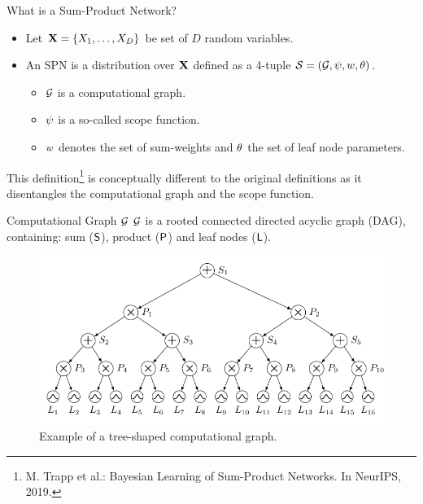\begin{frame}{What is a Sum-Product Network?}
\begin{itemize}
  \item Let $\mathbf{X} = \{X_1, \dots, X_D\}$ be set of $D$ random variables.
  \item An SPN is a distribution over $\mathbf{X}$ defined as a 4-tuple $\mathcal{S} = (\mathcal{G}, \psi, w, \mathbf{\theta})$.
  \begin{itemize}
    \item $\mathcal{G}$ is a computational graph.
    \item $\psi$ is a so-called scope function.
    \item $w$ denotes the set of sum-weights and $\mathbf{\theta}$ the set of leaf node parameters.
  \end{itemize}
\end{itemize}
 \small This definition\footnote{\scriptsize M. Trapp et al.: Bayesian Learning of Sum-Product Networks. In NeurIPS, 2019.} is conceptually different to the original definitions as it disentangles the computational graph and the scope function.
\end{frame}

\begin{frame}{Computational Graph $\mathcal{G}$}
 $\mathcal{G}$ is a rooted connected directed acyclic graph (DAG), containing: sum ($\mathsf{S}$), product ($\mathsf{P}$) and leaf nodes ($\mathsf{L}$).

\begin{figure}
  \includegraphics[width=\textwidth]{computation_graph}
  \caption{Example of a tree-shaped computational graph.}
\end{figure}
\end{frame}

